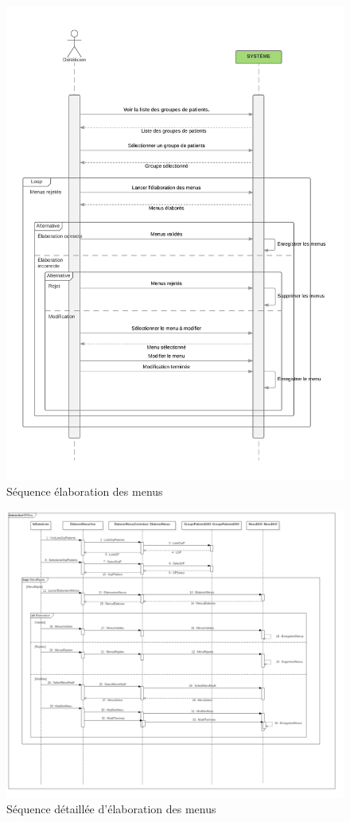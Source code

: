 \begin{figure}
  \centering
      \includegraphics[width=1.00\textwidth]{../../CasDUtilisations/MenuGen/Sequence/ElaborationMenus.png} %
\caption{Séquence élaboration des menus}
\label{MenuGenSeq}
\end{figure}

\begin{figure}
  \centering
      \includegraphics[width=1.00\textwidth]{../../CasDUtilisations/MenuGen/Sequence/EMSeq.png} %
\caption{Séquence détaillée d'élaboration des menus}
\label{MenuGenSeqDetail}
\end{figure}

